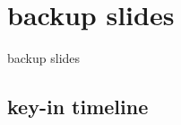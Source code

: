 \date{}
\title{}
\date{}

\begin{frame}
    \titlepage
\end{frame}





\section{backup slides}
\begin{frame}{backup slides}
\end{frame}

\subsection{key-in timeline}


